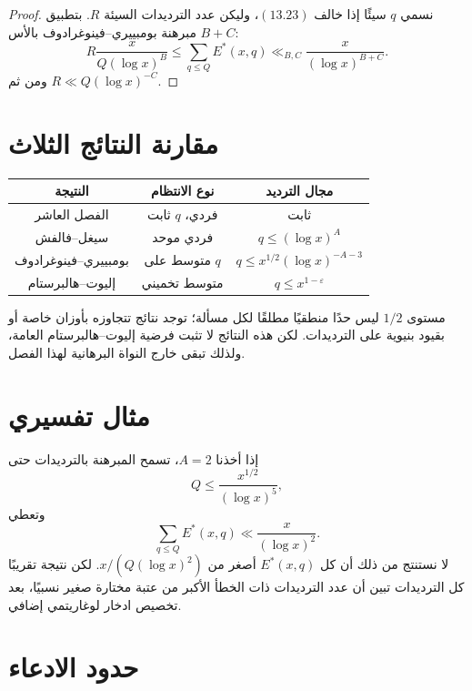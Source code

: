 \begin{proof}
نسمي \(q\) سيئًا إذا خالف \((13.23)\)، وليكن عدد الترديدات السيئة \(R\).
بتطبيق مبرهنة بومبييري--فينوغرادوف بالأس \(B+C\):
\[
R\frac{x}{Q(\log x)^B}
\le
\sum_{q\le Q}E^*(x,q)
\ll_{B,C}
\frac{x}{(\log x)^{B+C}}.
\]
ومن ثم \(R\ll Q(\log x)^{-C}\).
\end{proof}

\section{مقارنة النتائج الثلاث}

\begin{center}
\begin{tabular}{|c|c|c|}
\hline
النتيجة & نوع الانتظام & مجال الترديد \\
\hline
الفصل العاشر & فردي، \(q\) ثابت & ثابت \\
\hline
سيغل--فالفش & فردي موحد & \(q\le(\log x)^A\) \\
\hline
بومبييري--فينوغرادوف & متوسط على \(q\) & \(q\le x^{1/2}(\log x)^{-A-3}\) \\
\hline
إليوت--هالبرستام & متوسط تخميني & \(q\le x^{1-\varepsilon}\) \\
\hline
\end{tabular}
\end{center}

مستوى \(1/2\) ليس حدًا منطقيًا مطلقًا لكل مسألة؛ توجد نتائج تتجاوزه بأوزان
خاصة أو بقيود بنيوية على الترديدات. لكن هذه النتائج لا تثبت فرضية
إليوت--هالبرستام العامة، ولذلك تبقى خارج النواة البرهانية لهذا الفصل.

\section{مثال تفسيري}

إذا أخذنا \(A=2\)، تسمح المبرهنة بالترديدات حتى
\[
Q\le\frac{x^{1/2}}{(\log x)^5},
\]
وتعطي
\[
\sum_{q\le Q}E^*(x,q)
\ll\frac{x}{(\log x)^2}.
\]
لا نستنتج من ذلك أن كل \(E^*(x,q)\) أصغر من
\(x/(Q(\log x)^2)\). لكن نتيجة تقريبًا كل الترديدات تبين أن عدد الترديدات
ذات الخطأ الأكبر من عتبة مختارة صغير نسبيًا، بعد تخصيص ادخار لوغاريتمي
إضافي.

\section{حدود الادعاء}

